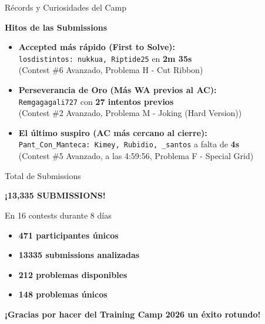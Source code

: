 \documentclass{beamer}
\begin{document}
\begin{frame}{Récords y Curiosidades del Camp}
\begin{center}
\Large
\textbf{Hitos de las Submissions}

\vspace{0.4cm}

\small
\begin{itemize}
    \item \textbf{Accepted más rápido (First to Solve):} \\
    \texttt{losdistintos: nukkua, Riptide25} en \textbf{2m 35s} \\
    {\footnotesize (Contest \#6 Avanzado, Problema H - Cut Ribbon)}
    
    \vspace{0.3cm}
    \item \textbf{Perseverancia de Oro (Más WA previos al AC):} \\
    \texttt{Remgagagali727} con \textbf{27 intentos previos} \\
    {\footnotesize (Contest \#2 Avanzado, Problema M - Joking (Hard Version))}
    
    \vspace{0.3cm}
    \item \textbf{El último suspiro (AC más cercano al cierre):} \\
    \texttt{Pant\_Con\_Manteca: Kimey, Rubidio, \_santos} a falta de \textbf{4s} \\
    {\footnotesize (Contest \#5 Avanzado, a las 4:59:56, Problema F - Special Grid)}
\end{itemize}
\end{center}
\end{frame}

\begin{frame}{Total de Submissions}
\begin{center}
\Huge
\textbf{¡13,335 SUBMISSIONS!}

\vspace{0.7cm}

\textsf{\Large En 16 contests durante 8 días}

\vspace{0.3cm}

\normalsize
\begin{itemize}
\item \textbf{471 participantes únicos}
\item \textbf{13335 submissions analizadas}
\item \textbf{212 problemas disponibles}
\item \textbf{148 problemas únicos}
\end{itemize}

\vspace{0.7cm}

\textbf{¡Gracias por hacer del Training Camp 2026 un éxito rotundo!}
\end{center}
\end{frame}
\end{document}
